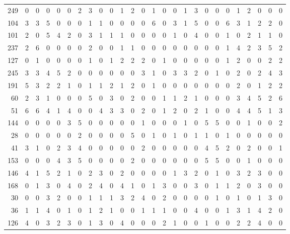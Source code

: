 \begin{longtable}{@{\extracolsep{\fill}}rccccccccccccccccccccccccc@{}}
249 & 0 & 0 & 0 & 0 & 0 & 2 & 3 & 0 & 0 & 1 & 2 & 0 & 1 & 0 & 0 & 1 & 3 & 0 & 0 & 0 & 1 & 2 & 0 & 0 & 0 \\
104 & 3 & 3 & 5 & 0 & 0 & 0 & 1 & 1 & 0 & 0 & 0 & 0 & 6 & 0 & 3 & 1 & 5 & 0 & 0 & 6 & 3 & 1 & 2 & 2 & 0 \\
101 & 2 & 0 & 5 & 4 & 2 & 0 & 3 & 1 & 1 & 1 & 0 & 0 & 0 & 0 & 1 & 0 & 4 & 0 & 0 & 1 & 0 & 2 & 1 & 1 & 0 \\
237 & 2 & 6 & 0 & 0 & 0 & 0 & 2 & 0 & 0 & 1 & 1 & 0 & 0 & 0 & 0 & 0 & 0 & 0 & 0 & 1 & 4 & 2 & 3 & 5 & 2 \\
127 & 0 & 1 & 0 & 0 & 0 & 0 & 1 & 0 & 1 & 2 & 2 & 2 & 0 & 1 & 0 & 0 & 0 & 0 & 0 & 1 & 2 & 0 & 0 & 2 & 2 \\
245 & 3 & 3 & 4 & 5 & 2 & 0 & 0 & 0 & 0 & 0 & 0 & 3 & 1 & 0 & 3 & 3 & 2 & 0 & 1 & 0 & 2 & 0 & 2 & 4 & 3 \\
191 & 5 & 3 & 2 & 2 & 1 & 0 & 1 & 1 & 2 & 1 & 2 & 0 & 1 & 0 & 0 & 0 & 0 & 0 & 0 & 0 & 2 & 0 & 1 & 2 & 2 \\
60 & 2 & 3 & 1 & 0 & 0 & 0 & 5 & 0 & 3 & 0 & 2 & 0 & 0 & 1 & 1 & 2 & 1 & 0 & 0 & 0 & 3 & 4 & 5 & 2 & 6 \\
51 & 6 & 6 & 4 & 1 & 4 & 0 & 0 & 4 & 3 & 3 & 0 & 2 & 0 & 1 & 2 & 0 & 2 & 1 & 0 & 0 & 4 & 4 & 5 & 1 & 3 \\
144 & 0 & 0 & 0 & 0 & 3 & 5 & 0 & 0 & 0 & 0 & 0 & 1 & 0 & 0 & 0 & 1 & 0 & 5 & 5 & 0 & 0 & 1 & 0 & 0 & 2 \\
28 & 0 & 0 & 0 & 0 & 0 & 2 & 0 & 0 & 0 & 0 & 5 & 0 & 1 & 0 & 1 & 0 & 1 & 1 & 0 & 1 & 0 & 0 & 0 & 0 & 0 \\
41 & 3 & 1 & 0 & 2 & 3 & 4 & 0 & 0 & 0 & 0 & 0 & 2 & 0 & 0 & 0 & 0 & 0 & 4 & 5 & 2 & 0 & 2 & 0 & 0 & 1 \\
153 & 0 & 0 & 0 & 4 & 3 & 5 & 0 & 0 & 0 & 0 & 2 & 0 & 0 & 0 & 0 & 0 & 0 & 5 & 5 & 0 & 0 & 1 & 0 & 0 & 0 \\
146 & 4 & 1 & 5 & 2 & 1 & 0 & 2 & 3 & 0 & 2 & 0 & 0 & 0 & 0 & 1 & 3 & 2 & 0 & 1 & 0 & 3 & 2 & 3 & 0 & 0 \\
168 & 0 & 1 & 3 & 0 & 4 & 0 & 2 & 4 & 0 & 4 & 1 & 0 & 1 & 3 & 0 & 0 & 3 & 0 & 1 & 1 & 2 & 0 & 3 & 0 & 0 \\
30 & 0 & 0 & 3 & 2 & 0 & 0 & 1 & 1 & 1 & 3 & 2 & 4 & 0 & 2 & 0 & 0 & 0 & 0 & 1 & 0 & 1 & 0 & 1 & 3 & 0 \\
36 & 1 & 1 & 4 & 0 & 1 & 0 & 1 & 2 & 1 & 0 & 0 & 1 & 1 & 1 & 0 & 0 & 4 & 0 & 0 & 1 & 3 & 1 & 4 & 2 & 0 \\
126 & 4 & 0 & 3 & 2 & 3 & 0 & 1 & 3 & 0 & 4 & 0 & 0 & 0 & 2 & 1 & 0 & 0 & 1 & 0 & 0 & 2 & 2 & 4 & 0 & 0 \\

\end{longtable}
